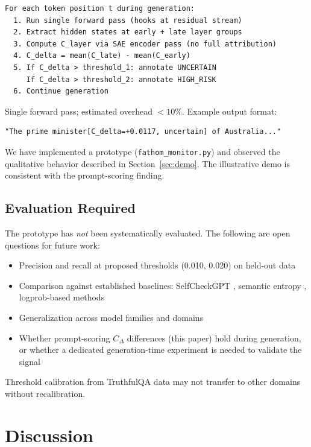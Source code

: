 \documentclass[10pt]{article}
\begin{document}
\begin{verbatim}
For each token position t during generation:
  1. Run single forward pass (hooks at residual stream)
  2. Extract hidden states at early + late layer groups
  3. Compute C_layer via SAE encoder pass (no full attribution)
  4. C_delta = mean(C_late) - mean(C_early)
  5. If C_delta > threshold_1: annotate UNCERTAIN
     If C_delta > threshold_2: annotate HIGH_RISK
  6. Continue generation
\end{verbatim}

Single forward pass; estimated overhead ${<}10\%$. Example output format:

\begin{verbatim}
"The prime minister[C_delta=+0.0117, uncertain] of Australia..."
\end{verbatim}

We have implemented a prototype (\texttt{fathom\_monitor.py}) and observed the qualitative behavior described in Section~\ref{sec:demo}. The illustrative demo is consistent with the prompt-scoring finding.

\subsection{Evaluation Required}

The prototype has \textit{not} been systematically evaluated. The following are open questions for future work:
\begin{itemize}
    \item Precision and recall at proposed thresholds (0.010, 0.020) on held-out data
    \item Comparison against established baselines: SelfCheckGPT \citep{manakul2023}, semantic entropy \citep{kuhn2023}, logprob-based methods
    \item Generalization across model families and domains
    \item Whether prompt-scoring $C_{\Delta}$ differences (this paper) hold during generation, or whether a dedicated generation-time experiment is needed to validate the signal
\end{itemize}

Threshold calibration from TruthfulQA data may not transfer to other domains without recalibration.

\section{Discussion}
\end{document}
